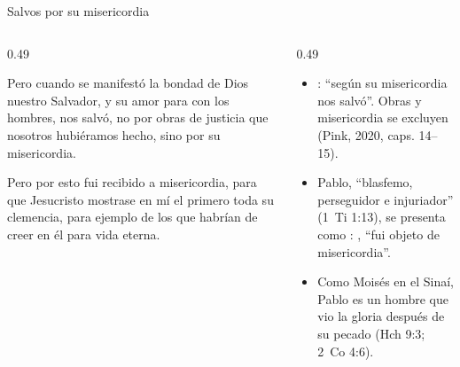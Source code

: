 \begin{frame}{Salvos por su misericordia}
\begin{columns}[t,onlytextwidth]
\begin{column}{0.49\textwidth}
\begin{cita}Pero cuando se manifestó la bondad de Dios nuestro Salvador, y su amor para con los hombres, nos salvó, no por obras de justicia que nosotros hubiéramos hecho, sino por su misericordia.\end{cita}
\begin{cita}Pero por esto fui recibido a misericordia, para que Jesucristo mostrase en mí el primero toda su clemencia, para ejemplo de los que habrían de creer en él para vida eterna.\end{cita}
\end{column}
\begin{column}{0.49\textwidth}\small
\begin{itemize}
\item {}: ``según su misericordia nos salvó''. Obras y misericordia se excluyen (Pink, 2020, caps. 14--15).
\item Pablo, ``blasfemo, perseguidor e injuriador'' (1~Ti 1:13), se presenta como : , ``fui objeto de misericordia''.
\item Como Moisés en el Sinaí, Pablo es un hombre que vio la gloria después de su pecado (Hch 9:3; 2~Co 4:6).
\end{itemize}
\end{column}
\end{columns}
\end{frame}

